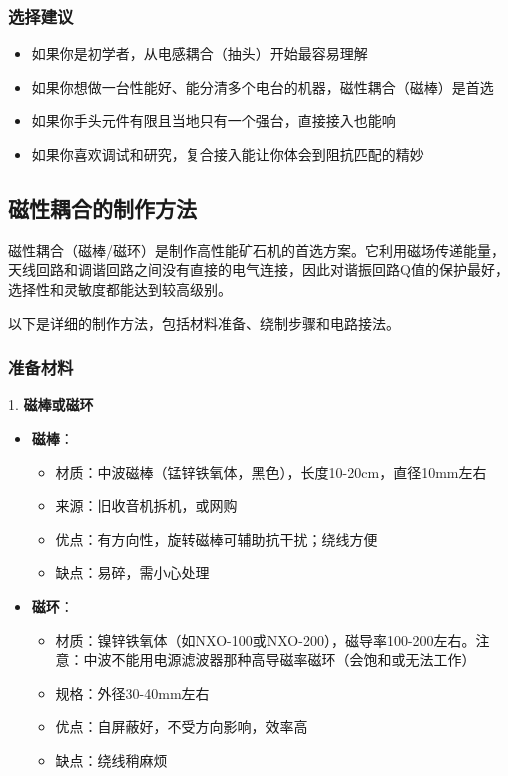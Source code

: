 \documentclass[12pt,UTF8]{ctexbook}
\begin{document}
\subsubsection{选择建议}

\begin{itemize}[leftmargin=3.5em]
	\item 如果你是初学者，从电感耦合（抽头）开始最容易理解
	\item 如果你想做一台性能好、能分清多个电台的机器，磁性耦合（磁棒）是首选
	\item 如果你手头元件有限且当地只有一个强台，直接接入也能响
	\item 如果你喜欢调试和研究，复合接入能让你体会到阻抗匹配的精妙
\end{itemize}

\subsection{磁性耦合的制作方法}

磁性耦合（磁棒/磁环）是制作高性能矿石机的首选方案。它利用磁场传递能量，天线回路和调谐回路之间没有直接的电气连接，因此对谐振回路Q值的保护最好，选择性和灵敏度都能达到较高级别。

以下是详细的制作方法，包括材料准备、绕制步骤和电路接法。

\subsubsection{准备材料}

1. \textbf{磁棒或磁环}
\begin{itemize}[leftmargin=3.5em]
	\item \textbf{磁棒}：
	\begin{itemize}[leftmargin=3.5em]
		\item 材质：中波磁棒（锰锌铁氧体，黑色），长度10-20cm，直径10mm左右
		\item 来源：旧收音机拆机，或网购
		\item 优点：有方向性，旋转磁棒可辅助抗干扰；绕线方便
		\item 缺点：易碎，需小心处理
	\end{itemize}
	\item \textbf{磁环}：
	\begin{itemize}[leftmargin=3.5em]
		\item 材质：镍锌铁氧体（如NXO-100或NXO-200），磁导率100-200左右。注意：中波不能用电源滤波器那种高导磁率磁环（会饱和或无法工作）
		\item 规格：外径30-40mm左右
		\item 优点：自屏蔽好，不受方向影响，效率高
		\item 缺点：绕线稍麻烦
	\end{itemize}
\end{itemize}
\end{document}
